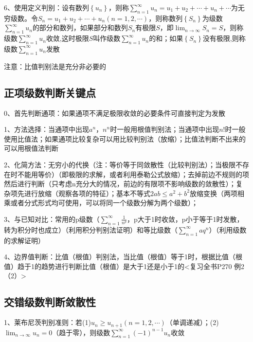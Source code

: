 6、使用定义判别：设有数列$\left\{u_{n}\right\}$，则称$\sum_{n=1}^{\infty} u_{n}=u_{1}+u_{2}+\cdots+u_{n}+\cdots$为无穷级数。令$S_{n}=u_{1}+u_{2}+\cdots+u_{n}(n=1,2, \cdots)$，则称数列$\left\{S_{n}\right\}$为级数$\sum_{n=1}^{\infty} u_{n}$的部分和数列，如果部分和数列$ S_{n}$有极限$S$，即$\lim_{n \rightarrow \infty} S_{n}=S$，则称级数$\sum_{n=1}^{\infty} u_{n}$收敛,这时极限$S$叫作级数$\sum_{n=1}^{\infty} u_{n}$的和；如果$\left\{S_{n}\right\}$没有极限,则称级数$\sum_{n=1}^{\infty} u_{n}$发散

注意：比值判别法是充分非必要的



\subsection{正项级数判断关键点}

0、首先判断通项：如果通项不满足极限收敛的必要条件可直接判定为发散

1、方法选择：当通项中出现$a^n$，$n^n$时一般用根值判别法；当通项中出现$n!$时一般使用比值法；如果通项比较复杂可以用比较判别法（放缩）；比值法判断不出来的可以用根值法判断

2、化简方法：无穷小的代换（注：等价等于同敛散性（比较判别法）；当极限不存在时不能用等价）（即极限的求解，或者利用泰勒公式放缩）；去掉前边不规则的项然后进行判断（只考虑n充分大的情况，前边的有限项不影响级数的敛散性）；复杂项先进行放缩（观察各项的特征）；基本不等式$2ab \le a^2 + b^2$放缩变换（两项相乘或者分式形式均可使用，可以将同一个级数分解为两个级数）；

3、与已知对比：常用的p级数（$\sum_{n=1}^{\infty} \frac 1{n^p}$，p大于1时收敛，p小于等于1时发散，转为积分时也成立）（利用积分判别法证明）和等比级数（$\sum_{n=1}^{\infty} a{q^n}$）（利用级数的求解证明）

4、边界值判断：比值（根值）判别法，当比值（根值）等于1时，根据比值（根值）趋于1的趋势进行判断比值（根值）是大于1还是小于1的<复习全书P270 例2 （2）>



\subsection{交错级数判断敛散性}

1、莱布尼茨判别准则：若(1)$u_{n} \geqslant u_{n+1}(n=1,2, \cdots)$（单调递减）；(2)$\lim_{n \rightarrow \infty} u_{n}=0$（趋于零），则级数$\sum_{n=1}^{\infty}(-1)^{n-1} u_{n}$收敛

